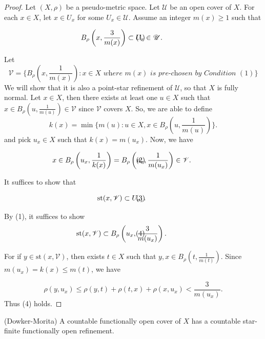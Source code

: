 \documentclass[main.tex]{subfiles}
\begin{document}
\begin{proof}
Let $(X, \rho)$ be a pseudo-metric space. Let $\mathscr{U}$ be an open cover of $X$. For each $x \in X$, let $x\in U_x$ for some $U_x \in \mathscr{U}$.
Assume an integer $m(x)\ge 1$ such that

\begin{equation}
	\mathclap{B_\rho\left(x, \frac{3}{m(x)}\right) \subset U_x\in \mathscr{U}.} \tag*{(1)}
\end{equation}

\noindent Let 
$$\mathscr{V} = \biggl\{
	B_\rho\left(x, \frac{1}{m(x)}\right): x\in X  \textit{ where } m(x)  \textit{ is pre-chosen by Condition } (1) 
	\biggr\}$$
We will show that it is also a point-star refinement of $\mathscr{U}$, 
so that $X$ is fully normal. 
Let $x \in X$, then there exists at least one $u \in X$ such that
$x\in B_\rho\left(u, \frac{1}{m(u)}\right)\in\mathscr{V}$
since $\mathscr{V}$ covers $X$.
So, we are able to define
$$k(x) = \min\biggl\{m(u): u\in X, x\in B_\rho\left(u, \frac{1}{m(u)}\right)\biggr\}.$$
and pick $u_x\in X$ such that $k(x) = m(u_x)$. Now, we have

\begin{equation}
	\mathclap{x\in B_\rho\left(u_x, \frac{1}{k(x)}\right) 
		= B_\rho\left(u_x, \frac{1}{m(u_x)}\right)\in \mathscr{V}.} \tag*{(2)}
\end{equation}

\noindent It suffices to show that 

\begin{equation}
	\mathclap{\mathrm{st}(x, \mathscr{V}) \subset U_{u_x}.} \tag*{(3)}
\end{equation}

\noindent By (1), it suffices to show
\begin{equation}
	\mathclap{\mathrm{st}(x, \mathscr{V}) \subset B_\rho\left(u_x, \frac{3}{m(u_x)}\right).} \tag*{(4)}
\end{equation}

\noindent For if $y \in \mathrm{st}(x, \mathscr{V})$, then exists $t\in X$ 
such that $y, x \in B_\rho\left(t, \frac{1}{m(t)}\right)$.
Since $m(u_x)=k(x) \le m(t)$, we have

$$\rho(y, u_x) \le \rho(y, t) + \rho(t, x) + \rho(x, u_x) < \frac{3}{m(u_x)}.$$
Thus (4) holds. 
\end{proof}

{\theorem{} \label{th:2.1.3}
\textup{(Dowker-Morita)} A countable functionally open cover of $X$ 
has a countable star-finite functionally open refinement.
}
\end{document}
